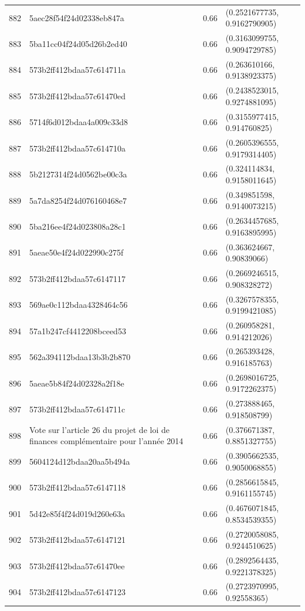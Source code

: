 \begin{table}[ht]
\begin{tabular}{rlrl}
  882 & 5aec28f54f24d02338eb847a & 0.66 & (0.2521677735, 0.9162790905) \\ 
  883 & 5ba11cc04f24d05d26b2ed40 & 0.66 & (0.3163099755, 0.9094729785) \\ 
  884 & 573b2ff412bdaa57c614711a & 0.66 & (0.263610166, 0.9138923375) \\ 
  885 & 573b2ff412bdaa57c61470ed & 0.66 & (0.2438523015, 0.9274881095) \\ 
  886 & 5714f6d012bdaa4a009c33d8 & 0.66 & (0.3155977415, 0.914760825) \\ 
  887 & 573b2ff412bdaa57c614710a & 0.66 & (0.2605396555, 0.9179314405) \\ 
  888 & 5b2127314f24d0562be00c3a & 0.66 & (0.324114834, 0.9158011645) \\ 
  889 & 5a7da8254f24d076160468e7 & 0.66 & (0.349851598, 0.9140073215) \\ 
  890 & 5ba216ee4f24d023808a28c1 & 0.66 & (0.2634457685, 0.9163895995) \\ 
  891 & 5aeae50e4f24d022990c275f & 0.66 & (0.363624667, 0.90839066) \\ 
  892 & 573b2ff412bdaa57c6147117 & 0.66 & (0.2669246515, 0.908328272) \\ 
  893 & 569ae0c112bdaa4328464c56 & 0.66 & (0.3267578355, 0.9199421085) \\ 
  894 & 57a1b247cf4412208bceed53 & 0.66 & (0.260958281, 0.914212026) \\ 
  895 & 562a394112bdaa13b3b2b870 & 0.66 & (0.265393428, 0.916185763) \\ 
  896 & 5aeae5b84f24d02328a2f18e & 0.66 & (0.2698016725, 0.9172262375) \\ 
  897 & 573b2ff412bdaa57c614711c & 0.66 & (0.273888465, 0.918508799) \\ 
  898 & Vote sur l'article 26 du projet de loi de finances complémentaire pour l'année 2014 & 0.66 & (0.376671387, 0.8851327755) \\ 
  899 & 5604124d12bdaa20aa5b494a & 0.66 & (0.3905662535, 0.9050068855) \\ 
  900 & 573b2ff412bdaa57c6147118 & 0.66 & (0.2856615845, 0.9161155745) \\ 
  901 & 5d42e85f4f24d019d260e63a & 0.66 & (0.4676071845, 0.8534539355) \\ 
  902 & 573b2ff412bdaa57c6147121 & 0.66 & (0.2720058085, 0.9244510625) \\ 
  903 & 573b2ff412bdaa57c61470ee & 0.66 & (0.2892564435, 0.9221378325) \\ 
  904 & 573b2ff412bdaa57c6147123 & 0.66 & (0.2723970995, 0.92558365) \\ 

\end{tabular}
\end{table}
